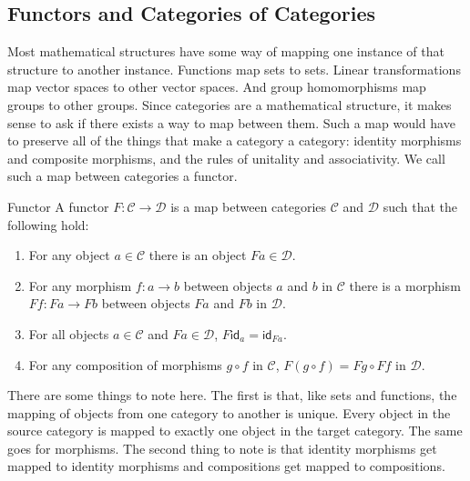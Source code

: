 \documentclass[12pt]{article}
\begin{document}
\subsection*{Functors and Categories of Categories}
Most mathematical structures have some way of mapping one instance of that structure to another instance.
Functions map sets to sets.
Linear transformations map vector spaces to other vector spaces.
And group homomorphisms map groups to other groups.
Since categories are a mathematical structure, it makes sense to ask if there exists a way to map between them.
Such a map would have to preserve all of the things that make a category a category: identity morphisms and composite morphisms, and the rules of unitality and associativity.
We call such a map between categories a functor.
\begin{definition}{Functor}{}
  A functor $F:\mathcal{C}\rightarrow\mathcal{D}$ is a map between categories $\mathcal{C}$ and $\mathcal{D}$ such that the following hold:
  \begin{enumerate}
    \item For any object $a\in\mathcal{C}$ there is an object $Fa\in\mathcal{D}$.
    \item For any morphism $f:a\rightarrow b$ between objects $a$ and $b$ in $\mathcal{C}$ there is a morphism $Ff:Fa\rightarrow Fb$ between objects $Fa$ and  $Fb$ in $\mathcal{D}$.
    \item For all objects $a\in\mathcal{C}$ and $Fa\in\mathcal{D}$, $F\mathsf{id}_a=\mathsf{id}_{Fa}$.
    \item For any composition of morphisms $g\circ f$ in $\mathcal{C}$, $F(g\circ f)=Fg\circ Ff$ in $\mathcal{D}$.
  \end{enumerate}
\end{definition}

There are some things to note here.
The first is that, like sets and functions, the mapping of objects from one category to another is unique.
Every object in the source category is mapped to exactly one object in the target category.
The same goes for morphisms.
The second thing to note is that identity morphisms get mapped to identity morphisms and compositions get mapped to compositions.
\end{document}
